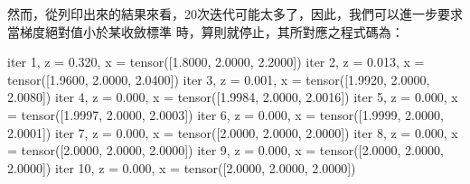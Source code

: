 \documentclass[letterpaper,10pt,english]{sphinxmanual}
\begin{document}
然而，從列印出來的結果來看，20次迭代可能太多了，因此，我們可以進一步要求當梯度絕對值小於某收斂標準  時，算則就停止，其所對應之程式碼為：

\begin{sphinxVerbatim}[commandchars=\\\{\}]
  
  \PYG{p}{[}  \PYG{p}{]}
                   
  
    
     
          
      
      
       
\end{sphinxVerbatim}

\begin{sphinxVerbatim}[commandchars=\\\{\}]
iter  1, z = 0.320, x = tensor([1.8000, 2.0000, 2.2000])
iter  2, z = 0.013, x = tensor([1.9600, 2.0000, 2.0400])
iter  3, z = 0.001, x = tensor([1.9920, 2.0000, 2.0080])
iter  4, z = 0.000, x = tensor([1.9984, 2.0000, 2.0016])
iter  5, z = 0.000, x = tensor([1.9997, 2.0000, 2.0003])
iter  6, z = 0.000, x = tensor([1.9999, 2.0000, 2.0001])
iter  7, z = 0.000, x = tensor([2.0000, 2.0000, 2.0000])
iter  8, z = 0.000, x = tensor([2.0000, 2.0000, 2.0000])
iter  9, z = 0.000, x = tensor([2.0000, 2.0000, 2.0000])
iter 10, z = 0.000, x = tensor([2.0000, 2.0000, 2.0000])
\end{sphinxVerbatim}
\end{document}
